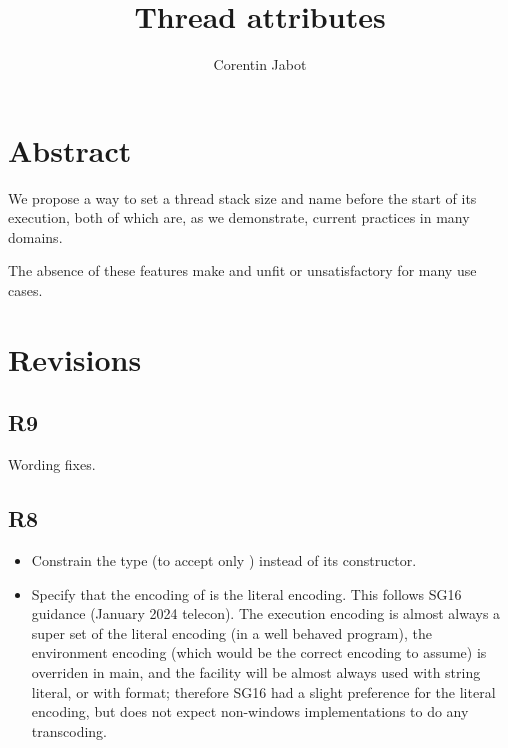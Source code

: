 \documentclass{wg21}
\title{Thread attributes}
\author{Corentin Jabot}{corentin.jabot@gmail.com}
\begin{document}
\maketitle

\setlength{\arrayrulewidth}{0.2mm}
\setlength{\tabcolsep}{8pt}
\renewcommand{\arraystretch}{1.}

\def\changemargin#1#2{\list{}{\rightmargin#2\leftmargin#1}\item[]}
\let\endchangemargin=\endlist
\setlength\extrarowheight{5pt}


\section{Abstract}

We propose a way to set a thread stack size and name before the start of its execution, both of which are,
as we demonstrate, current practices in many domains.

The absence of these features make  and  unfit or unsatisfactory for many use cases.

\section{Revisions}

\subsection{R9}
Wording fixes.
\subsection{R8}
\begin{itemize}
\item Constrain the type  (to accept only ) instead of its constructor.
\item Specify that the encoding of  is the literal encoding.
      This follows SG16 guidance (January 2024 telecon).
      The execution encoding is almost always a super set of the literal encoding (in a well behaved program), the environment encoding (which would be the correct encoding to assume) is overriden in main, and the facility will be almost always used with string literal, or with format;
      therefore SG16 had a slight preference for the literal encoding, but does not expect non-windows implementations to do any transcoding.
\end{itemize}
\end{document}
